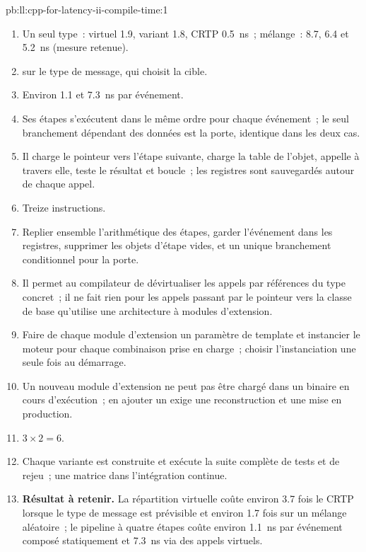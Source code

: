 \begin{solution}{pb:ll:cpp-for-latency-ii-compile-time:1}
\begin{enumerate}
\item Un seul type~: virtuel 1.9, variant 1.8, CRTP \qty{0.5}{\nano\second}~; mélange~: 8.7, 6.4 et \qty{5.2}{\nano\second} (mesure
retenue).
\item {} sur le type de message, qui choisit la cible.
\item Environ 1.1 et \qty{7.3}{\nano\second} par événement.
\item Ses étapes s'exécutent dans le même ordre pour chaque événement~; le seul branchement dépendant des données est la porte, identique dans les deux cas.
\item Il charge le pointeur vers l'étape suivante, charge la table de l'objet, appelle à travers elle, teste le résultat et boucle~; les registres
sont sauvegardés autour de chaque appel.
\item Treize instructions.
\item Replier ensemble l'arithmétique des étapes, garder l'événement dans les registres, supprimer les objets d'étape vides, et un
unique branchement conditionnel pour la porte.
\item Il permet au compilateur de dévirtualiser les appels par références du type concret~; il ne fait rien pour les appels passant par
le pointeur vers la classe de base qu'utilise une architecture à modules d'extension.
\item Faire de chaque module d'extension un paramètre de template et instancier le moteur pour chaque combinaison prise en charge~; choisir
l'instanciation une seule fois au démarrage.
\item Un nouveau module d'extension ne peut pas être chargé dans un binaire en cours d'exécution~; en ajouter un exige une reconstruction et une mise en production.
\item $3 \times 2 = 6$.
\item Chaque variante est construite et exécute la suite complète de tests et de rejeu~; une matrice dans l'intégration continue.
\item \textbf{Résultat à retenir.} La répartition virtuelle coûte environ 3.7 fois le CRTP lorsque le type de message est prévisible et environ 1.7
fois sur un mélange aléatoire~; le pipeline à quatre étapes coûte environ \qty{1.1}{\nano\second} par événement composé statiquement et
\qty{7.3}{\nano\second} via des appels virtuels.

\end{enumerate}
\end{solution}
